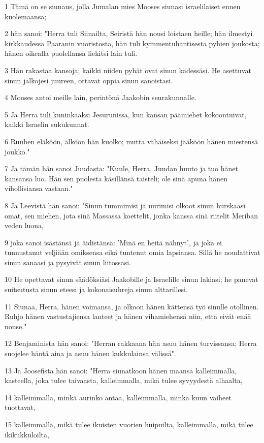 \par 1 Tämä on se siunaus, jolla Jumalan mies Mooses siunasi israelilaiset ennen kuolemaansa;
\par 2 hän sanoi: "Herra tuli Siinailta, Seiristä hän nousi loistaen heille; hän ilmestyi kirkkaudessa Paaranin vuoristosta, hän tuli kymmentuhantisesta pyhien joukosta; hänen oikealla puolellansa liekitsi lain tuli.
\par 3 Hän rakastaa kansoja; kaikki niiden pyhät ovat sinun kädessäsi. He asettuvat sinun jalkojesi juureen, ottavat oppia sinun sanoistasi.
\par 4 Mooses antoi meille lain, perintönä Jaakobin seurakunnalle.
\par 5 Ja Herra tuli kuninkaaksi Jesurunissa, kun kansan päämiehet kokoontuivat, kaikki Israelin sukukunnat.
\par 6 Ruuben eläköön, älköön hän kuolko; mutta vähäiseksi jääköön hänen miestensä joukko."
\par 7 Ja tämän hän sanoi Juudasta: "Kuule, Herra, Juudan huuto ja tuo hänet kansansa luo. Hän sen puolesta käsillänsä taisteli; ole sinä apuna hänen vihollisiansa vastaan."
\par 8 Ja Leevistä hän sanoi: "Sinun tummimisi ja uurimisi olkoot sinun hurskaasi omat, sen miehen, jota sinä Massassa koettelit, jonka kanssa sinä riitelit Meriban veden luona,
\par 9 joka sanoi isästänsä ja äidistänsä: 'Minä en heitä nähnyt', ja joka ei tunnustanut veljiään omiksensa eikä tuntenut omia lapsiansa. Sillä he noudattivat sinun sanaasi ja pysyivät sinun liitossasi.
\par 10 He opettavat sinun säädöksiäsi Jaakobille ja Israelille sinun lakiasi; he panevat suitsutusta sinun eteesi ja kokonaisuhreja sinun alttarillesi.
\par 11 Siunaa, Herra, hänen voimansa, ja olkoon hänen kättensä työ sinulle otollinen. Ruhjo hänen vastustajiensa lanteet ja hänen vihamiehensä niin, että eivät enää nouse."
\par 12 Benjaminista hän sanoi: "Herran rakkaana hän asuu hänen turvissansa; Herra suojelee häntä aina ja asuu hänen kukkulainsa välissä".
\par 13 Ja Joosefista hän sanoi: "Herra siunatkoon hänen maansa kalleimmalla, kasteella, joka tulee taivaasta, kalleimmalla, mikä tulee syvyydestä alhaalta,
\par 14 kalleimmalla, minkä aurinko antaa, kalleimmalla, minkä kuun vaiheet tuottavat,
\par 15 kalleimmalla, mikä tulee ikuisten vuorien huipuilta, kalleimmalla, mikä tulee ikikukkuloilta,
